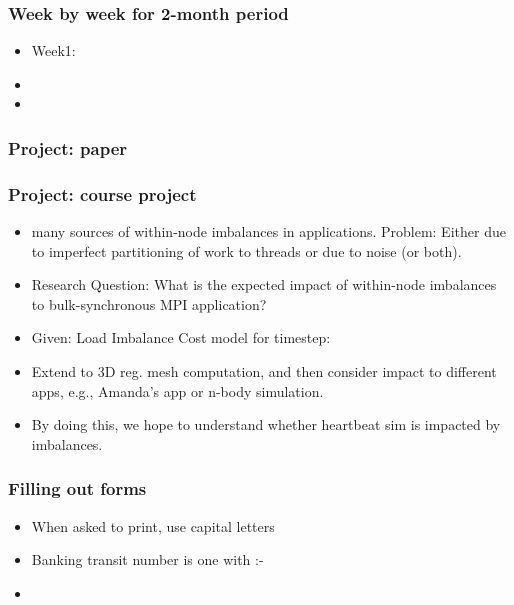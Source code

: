 \begin{frame} 
\frametitle{ Week by week for 2-month period} 
\begin{itemize}
\tiny \item \tiny Week1: 
\item \tiny 
\item \tiny 
\end{itemize} 
\end{frame}

\begin{frame}
\frametitle{Project: paper}
\end{frame}

\begin{frame}
\frametitle{Project: course project}
\begin{itemize} 
\tiny \item \tiny many sources of within-node imbalances in
applications. Problem: Either due to imperfect partitioning of work to
threads or due to noise (or both).  
\item \tiny Research Question: What is the expected impact of within-node
imbalances to bulk-synchronous MPI application? 
\tiny \item \tiny Given: Load Imbalance Cost model for timestep: 
\item \tiny Extend to 3D reg. mesh computation, and then consider
  impact to different apps, e.g., Amanda's app or n-body simulation. 
\item \tiny By doing this, we hope to understand whether heartbeat sim
  is impacted by imbalances.
\end{itemize} 
\end{frame} 



\begin{frame}[label=fillOutForms ] 
\frametitle{Filling out forms} 
\begin{itemize} 
\tiny \item \tiny When asked to print, use capital letters
\item \tiny Banking transit number is one with :- 
\item \tiny 
\end{itemize}
\end{frame} 
  
